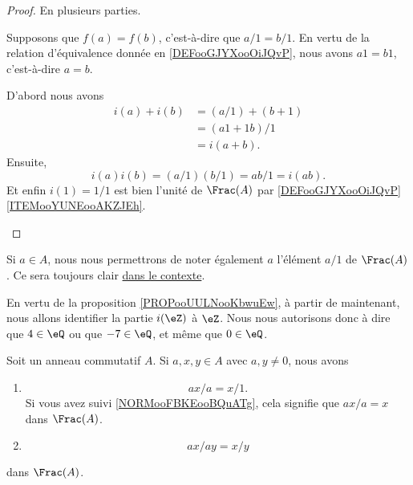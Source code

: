 \begin{proof}
	En plusieurs parties.
	\begin{subproof}
		\spitem[Injective]
		Supposons que \( f(a)=f(b)\), c'est-à-dire que \( a/1=b/1\). En vertu de la relation d'équivalence donnée en \ref{DEFooGJYXooOiJQvP}, nous avons \( a1=b1\), c'est-à-dire \( a=b\).

		D'abord nous avons
		\begin{subequations}
			\begin{align}
				i(a)+i(b) & =(a/1)+(b+1) \\
				          & =(a1+1b)/1   \\
				          & =i(a+b).
			\end{align}
		\end{subequations}
		Ensuite,
		\begin{equation}
			i(a)i(b)=(a/1)(b/1)=ab/1=i(ab).
		\end{equation}
		Et enfin \( i(1)=1/1\) est bien l'unité de \( \Frac(A)\) par \ref{DEFooGJYXooOiJQvP}\ref{ITEMooYUNEooAKZJEh}.
	\end{subproof}
\end{proof}

\begin{normaltext}		\label{NORMooFBKEooBQuATg}
	Si \( a\in A\), nous nous permettrons de noter également \( a\) l'élément \( a/1\) de \( \Frac(A)\). Ce sera toujours clair \href{http://www.madore.org/~david/weblog/d.2006-09-19.1360.html}{dans le contexte}.
\end{normaltext}

\begin{normaltext}		\label{NORMooVYEMooUiUfnE}
	En vertu de la proposition \ref{PROPooUULNooKbwuEw}, à partir de maintenant, nous allons identifier la partie \( i(\eZ)\) à \( \eZ\). Nous nous autorisons donc à dire que \( 4\in \eQ\) ou que \( -7\in \eQ\), et même que \( 0\in \eQ\).
\end{normaltext}

\begin{proposition}	\label{PROPooTXGUooRvViwT}
	Soit un anneau commutatif \( A\). Si \( a,x,y\in A\) avec \( a,y\neq 0\), nous avons
	\begin{enumerate}
		\item
		      \begin{equation}
			      ax/a=x/1.
		      \end{equation}
		      Si vous avez suivi \ref{NORMooFBKEooBQuATg}, cela signifie que \( ax/a=x\) dans \( \Frac(A)\).
		\item
		      \begin{equation}
			      ax/ay=x/y
		      \end{equation}
	\end{enumerate}
	dans \( \Frac(A)\).
\end{proposition}


